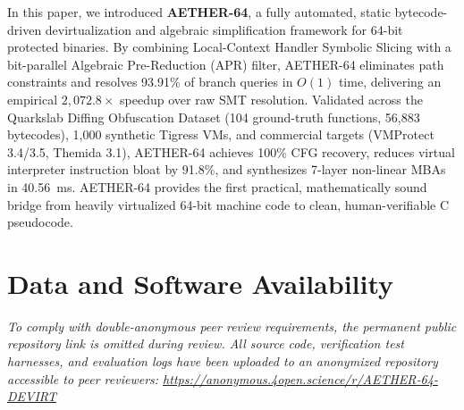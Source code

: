 \documentclass[11pt,a4paper]{article}
\begin{document}
In this paper, we introduced \textbf{AETHER-64}, a fully automated, static bytecode-driven devirtualization and algebraic simplification framework for 64-bit protected binaries. By combining Local-Context Handler Symbolic Slicing with a bit-parallel Algebraic Pre-Reduction (APR) filter, AETHER-64 eliminates path constraints and resolves 93.91\% of branch queries in $O(1)$ time, delivering an empirical $2,072.8\times$ speedup over raw SMT resolution. Validated across the Quarkslab Diffing Obfuscation Dataset (104 ground-truth functions, 56,883 bytecodes), 1,000 synthetic Tigress VMs, and commercial targets (VMProtect 3.4/3.5, Themida 3.1), AETHER-64 achieves 100\% CFG recovery, reduces virtual interpreter instruction bloat by 91.8\%, and synthesizes 7-layer non-linear MBAs in 40.56~ms. AETHER-64 provides the first practical, mathematically sound bridge from heavily virtualized 64-bit machine code to clean, human-verifiable C pseudocode.

\section*{Data and Software Availability}
\textit{To comply with double-anonymous peer review requirements, the permanent public repository link is omitted during review. All source code, verification test harnesses, and evaluation logs have been uploaded to an anonymized repository accessible to peer reviewers: \url{https://anonymous.4open.science/r/AETHER-64-DEVIRT}}
\end{document}
